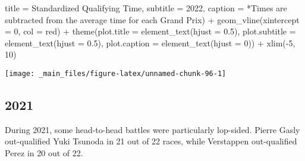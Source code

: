 \documentclass[
]{book}
\newenvironment{Shaded}{\begin{snugshade}}{\end{snugshade}}
\newcommand{\AttributeTok}[1]{\textcolor[rgb]{0.77,0.63,0.00}{#1}}
\newcommand{\DecValTok}[1]{\textcolor[rgb]{0.00,0.00,0.81}{#1}}
\newcommand{\FloatTok}[1]{\textcolor[rgb]{0.00,0.00,0.81}{#1}}
\newcommand{\FunctionTok}[1]{\textcolor[rgb]{0.00,0.00,0.00}{#1}}
\newcommand{\NormalTok}[1]{#1}
\newcommand{\SpecialCharTok}[1]{\textcolor[rgb]{0.00,0.00,0.00}{#1}}
\newcommand{\StringTok}[1]{\textcolor[rgb]{0.31,0.60,0.02}{#1}}
\begin{document}
\begin{Shaded}
\begin{Highlighting}[]
       \AttributeTok{title =} \StringTok{\textquotesingle{}Standardized Qualifying Time\textquotesingle{}}\NormalTok{,}
       \AttributeTok{subtitle =} \StringTok{\textquotesingle{}2022\textquotesingle{}}\NormalTok{,}
       \AttributeTok{caption =} \StringTok{\textquotesingle{}*Times are subtracted from the average time for each Grand Prix\textquotesingle{}}\NormalTok{) }\SpecialCharTok{+}
  \FunctionTok{geom\_vline}\NormalTok{(}\AttributeTok{xintercept =} \DecValTok{0}\NormalTok{, }\AttributeTok{col =} \StringTok{\textquotesingle{}red\textquotesingle{}}\NormalTok{) }\SpecialCharTok{+}
  \FunctionTok{theme}\NormalTok{(}\AttributeTok{plot.title =} \FunctionTok{element\_text}\NormalTok{(}\AttributeTok{hjust =} \FloatTok{0.5}\NormalTok{),}
        \AttributeTok{plot.subtitle =} \FunctionTok{element\_text}\NormalTok{(}\AttributeTok{hjust =} \FloatTok{0.5}\NormalTok{),}
        \AttributeTok{plot.caption =} \FunctionTok{element\_text}\NormalTok{(}\AttributeTok{hjust =} \DecValTok{0}\NormalTok{)) }\SpecialCharTok{+}
  \FunctionTok{xlim}\NormalTok{(}\SpecialCharTok{{-}}\DecValTok{5}\NormalTok{, }\DecValTok{10}\NormalTok{)}
\end{Highlighting}
\end{Shaded}

\begin{center}\texttt{[image: \_main\_files/figure-latex/unnamed-chunk-96-1]} \end{center}

\hypertarget{section-2}{%
\subsection{2021}\label{section-2}}

During 2021, some head-to-head battles were particularly lop-sided. Pierre Gasly out-qualified Yuki Tsunoda in 21 out of 22 races, while Verstappen out-qualified Perez in 20 out of 22.
\end{document}
